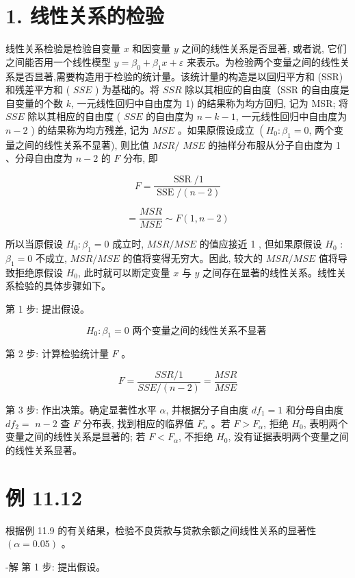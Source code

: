 \documentclass[10pt]{article}
\begin{document}
\begin{CJK*}{UTF8}{bsmi}
\section*{1. 线性关系的检验}
线性关系检验是检验自变量 $x$ 和因变量 $y$ 之间的线性关系是否显著, 或者说, 它们之间能否用一个线性模型 $y=\beta_{0}+\beta_{1} x+\varepsilon$ 来表示。为检验两个变量之间的线性关系是否显著,需要构造用于检验的统计量。该统计量的构造是以回归平方和 (SSR) 和残差平方和 ( $S S E$ ) 为基础的。将 $S S R$ 除以其相应的自由度（SSR 的自由度是自变量的个数 $k$, 一元线性回归中自由度为 1) 的结果称为均方回归, 记为 MSR; 将 $S S E$ 除以其相应的自由度 ( $S S E$ 的自由度为 $n-k-1$, 一元线性回归中自由度为 $n-2$ ) 的结果称为均方残差, 记为 $M S E$ 。如果原假设成立 $\left(H_{0}: \beta_{1}=0\right.$, 两个变量之间的线性关系不显著), 则比值 $M S R /$ $M S E$ 的抽样分布服从分子自由度为 1 、分母自由度为 $n-2$ 的 $F$ 分布, 即

$$
F=\frac{\operatorname{SSR} / 1}{\operatorname{SSE} /(n-2)}
$$


\begin{equation*}
=\frac{M S R}{M S E} \sim F(1, n-2) \tag{11.17}
\end{equation*}


所以当原假设 $H_{0}: \beta_{1}=0$ 成立时, $M S R / M S E$ 的值应接近 1 , 但如果原假设 $H_{0}$ : $\beta_{1}=0$ 不成立, $M S R / M S E$ 的值将变得无穷大。因此, 较大的 $M S R / M S E$ 值将导致拒绝原假设 $H_{0}$, 此时就可以断定变量 $x$ 与 $y$ 之间存在显著的线性关系。线性关系检验的具体步骤如下。

第 1 步: 提出假设。

$$
H_{0}: \beta_{1}=0 \text { 两个变量之间的线性关系不显著 }
$$

第 2 步: 计算检验统计量 $F$ 。

$$
F=\frac{S S R / 1}{S S E /(n-2)}=\frac{M S R}{M S E}
$$

第 3 步: 作出决策。确定显著性水平 $\alpha$, 并根据分子自由度 $d f_{1}=1$ 和分母自由度 $d f_{2}=$ $n-2$ 查 $F$ 分布表, 找到相应的临界值 $F_{\alpha}$ 。若 $F>F_{\alpha}$, 拒绝 $H_{0}$, 表明两个变量之间的线性关系是显著的; 若 $F<F_{\alpha}$, 不拒绝 $H_{0}$, 没有证据表明两个变量之间的线性关系显著。

\section*{例 11.12}
根据例 11.9 的有关结果，检验不良货款与贷款余额之间线性关系的显著性 $(\alpha=0.05)$ 。

-解 第 1 步: 提出假设。


\end{CJK*}
\end{document}
